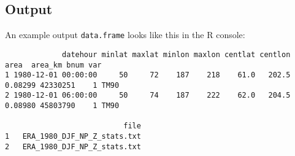 \documentclass{article}
\begin{document}
%

\subsection{Output}\label{tableoutput}

An example output \texttt{data.frame} looks like this in the R console:
\begin{verbatim}
             datehour minlat maxlat minlon maxlon centlat centlon    area  area_km bnum var
1 1980-12-01 00:00:00     50     72    187    218    61.0   202.5 0.08299 42330251    1 TM90
2 1980-12-01 06:00:00     50     74    187    222    62.0   204.5 0.08980 45803790    1 TM90

                           file
1   ERA_1980_DJF_NP_Z_stats.txt
2   ERA_1980_DJF_NP_Z_stats.txt
\end{verbatim}
\end{document}
